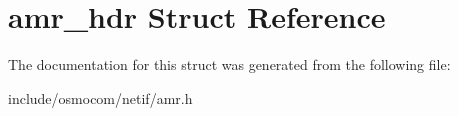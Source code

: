 \section{amr\+\_\+hdr Struct Reference}
\label{structamr__hdr}


The documentation for this struct was generated from the following file\+:\begin{DoxyCompactItemize}
\item 
include/osmocom/netif/amr.\+h\end{DoxyCompactItemize}
